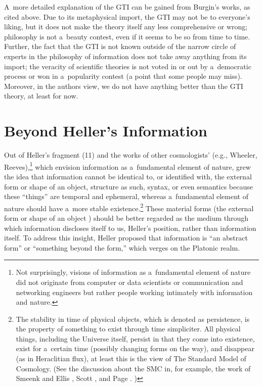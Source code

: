 A~more detailed explanation of the GTI can be gained from Burgin's works, as cited above. Due to its metaphysical import, the GTI may not be to everyone's liking, but it does not make the theory itself any less comprehensive or wrong; philosophy is not a~beauty contest, even if it seems to be so from time to time. Further, the fact that the GTI is not known outside of the narrow circle of experts in the philosophy of information does not take away anything from its import; the veracity of scientific theories is not voted in or out by a~democratic process or won in a~popularity contest (a point that some people may miss). Moreover, in the authors view, we do not have anything better than the GTI theory, at least for now.



\section{Beyond Heller's Information}

Out of Heller's fragment (11) and the works of other cosmologists' (e.g., Wheeler, Reeves),\footnote{Not surprisingly, visions of information as a~fundamental element of nature did not originate from computer or data scientists or communication and networking engineers but rather people working intimately with information and nature.} which envision information as a~fundamental element of nature, grew the idea that information cannot be identical to, or identified with, the external form or shape of an object, structure as such, syntax, or even semantics because these ``things'' are temporal and ephemeral, whereas a~fundamental element of nature should have a~more stable existence.\footnote{The stability in time of physical objects, which is denoted as persistence, is the property of something to exist through time simpliciter. All physical things, including the Universe itself, persist in that they come into existence, exist for a~certain time (possibly changing forms on the way), and disappear (as in Heraclitian flux), at least this is the view of The Standard Model of Cosmology. (See the discussion about the SMC in, for example, the work of Smeenk and Ellis 
\parencite*[][]{}, %
 Scott 
\parencite*[][]{scott_standard_2018}, %
 and Page 
\parencite*[][]{page_little_2020}.%
) } These material forms (the external form or shape of an object ) should be better regarded as the medium through which information discloses itself to us, Heller's position, rather than information itself. To address this insight, Heller proposed that information is ``an abstract form'' or ``something beyond the form,'' which verges on the Platonic realm.



